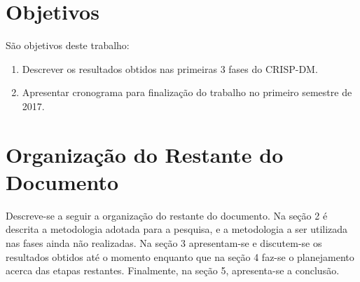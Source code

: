 \section{Objetivos}
São objetivos deste trabalho: 
\begin{enumerate}
    \item Descrever os resultados obtidos nas primeiras 3 fases do CRISP-DM.
    \item Apresentar cronograma para finalização do trabalho no primeiro semestre de
        2017.
\end{enumerate}

\section{Organização do Restante do Documento}
\par Descreve-se a seguir a organização do restante do documento. 
Na seção 2 é descrita a metodologia
adotada para a pesquisa, e a metodologia a ser utilizada nas 
fases ainda não realizadas. Na seção 3 apresentam-se e discutem-se os resultados
obtidos até o momento enquanto que na seção 4 faz-se o planejamento acerca das etapas
restantes. Finalmente, na seção 5, apresenta-se a conclusão.
